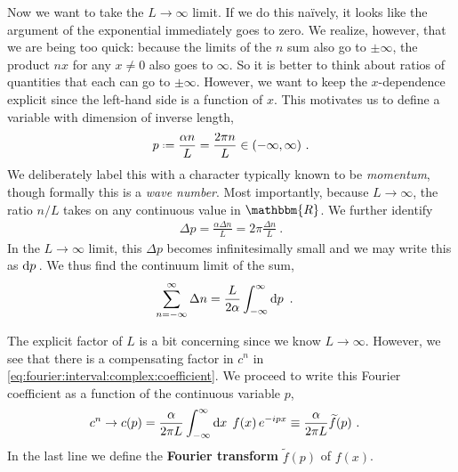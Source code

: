 Now we want to take the $L\to \infty$ limit. If we do this na\"ively, it looks like the argument of the exponential immediately goes to zero. We realize, however, that we are being too quick: because the limits of the $n$ sum also go to $\pm \infty$, the product $nx$ for any $x\neq 0$ also goes to $\infty$. So it is better to think about ratios of quantities that each can go to $\pm\infty$. However, we want to keep the $x$-dependence explicit since the left-hand side is a function of $x$. This motivates us to define a variable with dimension of inverse length,
\begin{align}
    p \defeq \frac{\alpha n}{L} = \frac{2\pi n}{L} \in (-\infty,\infty) \ .
\end{align}
We deliberately label this with a character typically known to be \emph{momentum}, though formally this is a \emph{wave number}. Most importantly, because $L\to\infty$, the ratio $n/L$ takes on any continuous value in $\mathbbm{R}$. We further identify 
\begin{align}
    \Delta p = \frac{\alpha \Delta n}{L} = 2\pi\frac{\Delta n}{L} \ .
\end{align}
In the $L\to\infty$ limit, this $\Delta p$ becomes infinitesimally small and we may write this as $\operatorname{d}\mkern-3mu^{}\mkern-1mu{p}\,$. We thus find the continuum limit of the sum,
\begin{align}
    \sum_{n=-\infty}^\infty \Delta n &=
    \frac{L}{2\alpha} \int_{-\infty}^\infty \operatorname{d}\mkern-3mu^{}\mkern-1mu{p}\, \ .
    \label{eq:toward:fourier:transform:sum:to:int}
\end{align}


The explicit factor of $L$ is a bit concerning since we know $L\to\infty$. However, we see that there is a compensating factor in $c^n$ in \eqref{eq:fourier:interval:complex:coefficient}. We proceed to write this Fourier coefficient as a function of the continuous variable $p$,
\begin{align}
    c^n \to c(p)
     &= \frac{\alpha}{2\pi L} \int_{-\infty}^{\infty} \operatorname{d}\mkern-3mu^{}\mkern-1mu{x}\,\; f(x)\, e^{-ip x} 
     \equiv 
     \frac{\alpha}{2\pi L} \widetilde{f}(p)
     \ .
    \label{eq:toward:fourier:transform:cn:to:cp}
\end{align}
In the last line we define the \textbf{Fourier transform} $\tilde{f}(p)$ of $f(x)$. 

